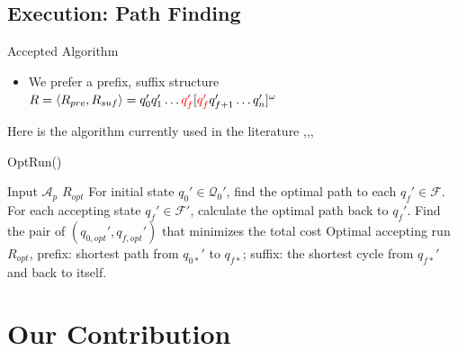 \documentclass{beamer}
\newcommand{\F}{\mathcal{F}}
\newcommand{\Q}{\mathcal{Q}}
\newcommand{\A}{\mathcal{A}}
\begin{document}
\subsection{Execution: Path Finding}
\begin{frame}{Accepted Algorithm}
\begin{itemize}
\item {
	We prefer a prefix, suffix structure $R = \langle R_{pre}, R_{suf} \rangle = q_0' q_1' \dots {\color{red} q_f'} [ {\color{red} q_f'} q_{f+1}' \dots q_n']^\omega$ 
}
\end{itemize}
Here is the algorithm currently used in the literature \cite{guo15},\cite{fainekos09},\cite{kloetzer08},\cite{smith2010}
\begin{algorithm}[H]
\caption{OptRun() \cite{guo15}}
\begin{algorithmic}[1]
\Require Input $\A_p$
\Ensure $R_{opt}$
\State For initial state $q_0' \in \Q_0'$, find the optimal path to each $q_f' \in \F$.
\State For each accepting state $q_f' \in \F'$, calculate the optimal path back to $q_f'$. 
\State Find the pair of $(q_{0,opt}',q_{f,opt}')$ that minimizes the total cost
\State Optimal accepting run $R_{opt}$, prefix: shortest path from $q_{0*}'$ to  $q_{f*}$; suffix: the shortest cycle from $q_{f*}'$ and back to itself.
\end{algorithmic}
\end{algorithm}
\end{frame}

\section{Our Contribution}
\end{document}
